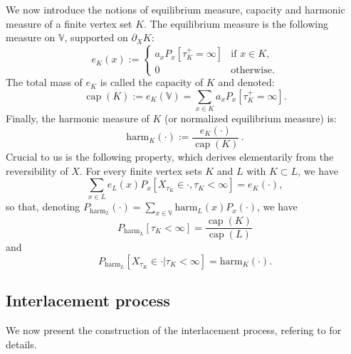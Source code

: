 \documentclass[12pt,a4paper]{article}
\newcommand{\1}[1]{{\mathbf 1}{\{#1\}}}
\newcommand{\8}{{\infty}}
\newcommand{\capa}{\mathop{\mathrm{cap}}}
\newcommand{\harm}{\textrm{harm}}
\begin{document}
We now introduce the notions of equilibrium measure, capacity and harmonic measure of a finite vertex set $K$. The equilibrium measure is the following measure on $\mathbb{V}$, supported on $\partial_X K$: %
\begin{equation}
  e_K(x) := 
  \begin{cases}
    a_x P_x[\tau_K^+=\infty] & \text{if } x\in  K,\\ 
    0 & \text{otherwise}.
  \end{cases}
\end{equation}
The total mass of $e_K$ is called the capacity of $K$ and denoted:
\begin{equation}
  \capa(K):=e_K(\mathbb{V})= \sum_{x\in K} a_x P_x[\tau_K^+=\infty].
\end{equation}
Finally, the harmonic measure of $K$ (or normalized equilibrium measure) is:
\begin{equation}
  \harm_K(\cdot):= \frac{e_K(\cdot)}{\capa(K)}\, .
\end{equation}
Crucial to us is the following property, which derives elementarily from the reversibility of $X$.
For every finite vertex sets $K$ and $L$ with $K\subset L$, we have
\begin{equation}\label{eq:consistency_eq_meas}
  \sum_{x\in L} e_L(x) P_x[X_{\tau_K}\in \cdot, \tau_K<\infty] = e_K(\cdot),
\end{equation}
so that, denoting $P_{\harm_L}(\cdot)=\sum_{x\in \mathbb{V}} \harm_L(x) P_x(\cdot)$, we have
\begin{equation}
  P_{\harm_L}[\tau_K<\infty ]= \frac{\capa(K)}{\capa(L)} 
\end{equation}
and
\begin{equation}
  P_{\harm_L}[X_{\tau_K} \in \cdot |\tau_K<\infty] = \harm_K(\cdot) .
\end{equation}


\subsection{Interlacement process}\label{sec:def_interl_process}

We now present the construction of the interlacement process, refering to \cite{Teixeira2009} for details.
\end{document}

